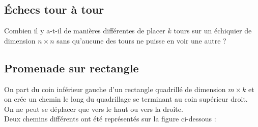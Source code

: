 \documentclass[oneside,12pt]{article}          %
\begin{document}
\subsection{Échecs tour à tour}
Combien il y a-t-il de manières différentes de placer $k$ tours sur un échiquier de dimension $n\times n$ sans qu'aucune des tours ne puisse en voir une autre ?



\subsection{Promenade sur rectangle}

On part du coin inférieur gauche d'un rectangle quadrillé de dimension $m\times k$ et on crée un chemin le long du quadrillage se terminant au coin supérieur droit.\\
On ne peut se déplacer que vers le haut ou vers la droite.\\[5pt]
Deux chemins différents ont été représentés sur la figure ci-dessous :
\end{document}
